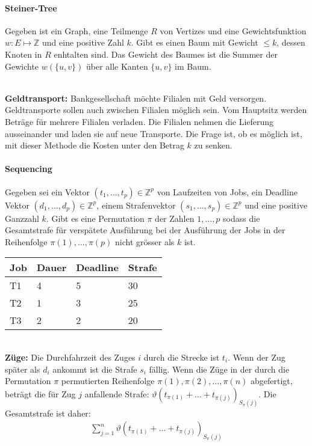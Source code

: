 \paragraph{Steiner-Tree} Gegeben ist ein Graph, eine Teilmenge \(R\) von Vertizes und eine Gewichtsfunktion \(w: E \mapsto \mathbb{Z}\) und eine positive Zahl \(k\). Gibt es einen Baum mit Gewicht \(\leq k\), dessen Knoten in \(R\) enhtalten sind. Das Gewicht des Baumes ist die Summer der Gewichte \(w(\{u,v\})\) über alle Kanten \(\{u,v\}\) im Baum.\\
\\
\textbf{Geldtransport:} Bankgesellschaft möchte Filialen mit Geld versorgen. Geldtransporte sollen auch zwischen Filialen möglich sein. Vom Hauptsitz werden Beträge für mehrere Filialen verladen. Die Filialen nehmen die Lieferung ausseinander und laden sie auf neue Transporte. Die Frage ist, ob es möglich ist, mit dieser Methode die Kosten unter den Betrag \(k\) zu senken.
\paragraph{Sequencing} Gegeben sei ein Vektor \((t_1, \dots, t_p) \in \mathbb{Z}^p\) von Laufzeiten von Jobs, ein Deadline Vektor \((d_1, \dots, d_p) \in \mathbb{Z}^p \), einem Strafenvektor \((s_1, \dots, s_p) \in \mathbb{Z}^p\) und eine positive Ganzzahl \(k\). Gibt es eine Permutation \(\pi\) der Zahlen \(1, \dots, p\) sodass die Gesamtstrafe für verspätete Ausführung bei der Ausführung der Jobs in der Reihenfolge \(\pi(1), \dots, \pi(p)\) nicht grösser als \(k\) ist.\\
\begin{tabular}{l|lll}
\hline
Job & Dauer & Deadline & Strafe \\ \hline
T1  & 4     & 5        & 30     \\
T2  & 1     & 3        & 25     \\
T3  & 2     & 2        & 20     \\ \hline
\end{tabular}\\
\textbf{Züge:} Die Durchfahrzeit des Zuges \(i\) durch die Strecke ist \(t_i\). Wenn der Zug später als \(d_i\) ankommt ist die Strafe \(s_i\) fällig. Wenn die Züge in der durch die Permutation \(\pi\) permutierten Reihenfolge \(\pi(1), \pi(2), \ldots, \pi(n)\) abgefertigt, beträgt die für Zug \(j\) anfallende Strafe: \(\vartheta(t_{\pi(1)} + \ldots + t_{\pi(j)})_{S_\pi(j)}\). Die Gesamtstrafe ist daher:
\begin{align*}
    \sum_{j=1}^n \vartheta(t_{\pi(1)} + \ldots + t_{\pi(j)})_{S_\pi(j)}
\end{align*}
